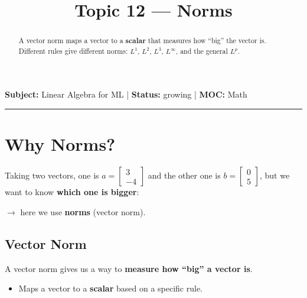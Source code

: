 \documentclass[11pt,a4paper]{article}
\title{Topic 12 --- Norms}
\author{}
\date{}
\begin{document}
\maketitle
\vspace{-2.2em}

\begin{center}
  \textbf{Subject:} Linear Algebra for ML \quad|\quad
  \textbf{Status:} growing \quad|\quad
  \textbf{MOC:} Math
\end{center}

\hrule
\vspace{4pt}

\begin{abstract}
\noindent A vector norm maps a vector to a \textbf{scalar} that measures how ``big'' the vector is.
Different rules give different norms: $L^1$, $L^2$, $L^3$, $L^\infty$, and the general $L^p$.
\end{abstract}

\section{Why Norms?}

Taking two vectors, one is $a = \begin{bmatrix} 3 \\ -4 \end{bmatrix}$ and the other one is
$b = \begin{bmatrix} 0 \\ 5 \end{bmatrix}$, but we want to know \textbf{which one is bigger}:

$\rightarrow$ here we use \textbf{norms} (vector norm).

\subsection{Vector Norm}

\begin{callout}
A vector norm gives us a way to \textbf{measure how ``big'' a vector is}.
\end{callout}

\begin{itemize}
  \item Maps a vector to a \textbf{scalar} based on a specific rule.
\end{itemize}

\end{document}
